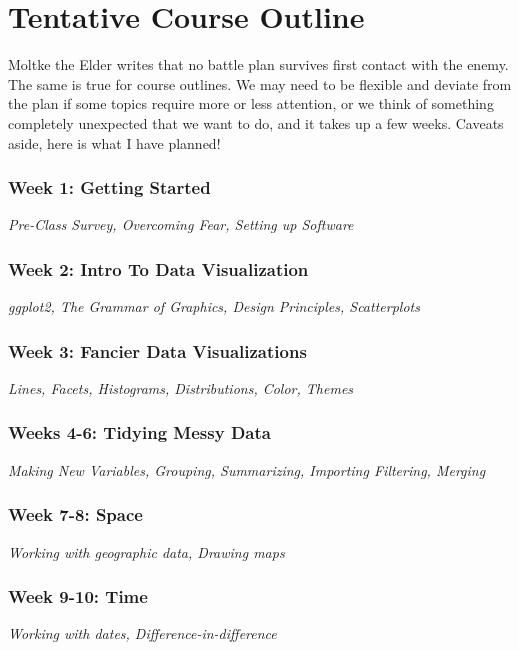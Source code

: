 \documentclass[11pt, letterpaper]{article}
\begin{document}
\section*{Tentative Course Outline}

Moltke the Elder writes that no battle plan survives first contact with the enemy. The same is true for course outlines. We may need to be flexible and deviate from the plan if some topics require more or less attention, or we think of something completely unexpected that we want to do, and it takes up a few weeks. Caveats aside, here is what I have planned!

\subsubsection*{Week 1: Getting Started}
\textit{Pre-Class Survey, Overcoming Fear, Setting up Software}

\subsubsection*{Week 2: Intro To Data Visualization}
\textit{ggplot2, The Grammar of Graphics, Design Principles, Scatterplots}

\subsubsection*{Week 3: Fancier Data Visualizations}
\textit{Lines, Facets, Histograms, Distributions, Color, Themes}

\subsubsection*{Weeks 4-6: Tidying Messy Data}
\textit{Making New Variables, Grouping, Summarizing, Importing Filtering, Merging}

\subsubsection*{Week 7-8: Space}
\textit{Working with geographic data, Drawing maps}

\subsubsection*{Week 9-10: Time}
\textit{Working with dates, Difference-in-difference}
\end{document}
